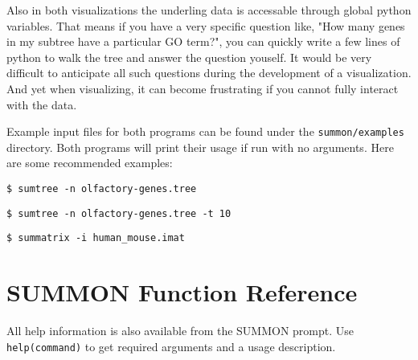 \documentclass[12pt]{article}
\newcommand{\code}[1]{{\tt #1}}
\newcommand{\codeblock}[1]{\vspace{.1in} {\tt #1} \vspace{.1in}}
\begin{document}
Also in both visualizations the underling data is accessable through global python
variables.  That means if you have a very specific question like, "How many
genes in my subtree have a particular GO term?", you can quickly write a few
lines of python to walk the tree and answer the question youself.  It would be
very difficult to anticipate all such questions during the development of a
visualization.  And yet when visualizing, it can become frustrating if you cannot
fully interact with the  data.

Example input files for both programs can be found under the 
\code{summon/examples} directory.  Both programs will print their usage if run
with no arguments.  Here are some recommended examples:

\codeblock{\$ sumtree -n olfactory-genes.tree}

\codeblock{\$ sumtree -n olfactory-genes.tree -t 10}

\codeblock{\$ summatrix -i human\_mouse.imat}


\clearpage
\section{SUMMON Function Reference}

All help information is also available from the SUMMON prompt.  Use 
\code{help(command)} to get required arguments and a usage description.


\end{document}
